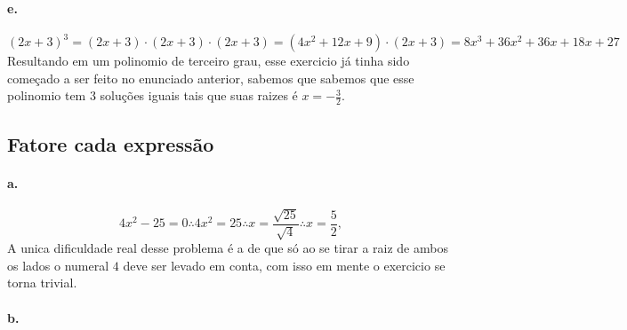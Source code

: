 \documentclass{article}
\begin{document}
	\paragraph{e.}
	\begin{equation}
	(2x+3)^3 = (2x+3) \cdot (2x+3) \cdot (2x+3) = (4x^2 + 12x + 9) \cdot (2x+3) = 8x^3 + 36x^2 + 36x + 18x + 27
	\end{equation}
	Resultando em um polinomio de terceiro grau, esse exercicio já tinha sido começado a ser feito no enunciado anterior, sabemos que sabemos que esse polinomio tem 3 soluções iguais tais que suas raizes é $x = -\frac{3}{2}$.


\subsection{Fatore cada expressão}
	\paragraph{a.}
	\begin{equation}
		4x^2 - 25 = 0 \therefore 4x^2 = 25 \therefore x= \frac{\sqrt{25}}{\sqrt{4}} \therefore x= \frac{5}{2},
	\end{equation}
	A unica dificuldade real desse problema é a de que só ao se tirar a raiz de ambos os lados o numeral $4$ deve ser levado em conta, com isso em mente o exercicio se torna trivial.

	\paragraph{b.}
	\begin{equation}
		
	\end{equation}

	














\end{document}
